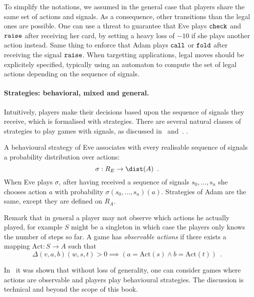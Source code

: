 To simplify the notations,
we assumed in the general case
that players share the same set of actions and signals.
As a consequence, other transitions than the legal ones
are possible. 
One can use a threat to guarantee that Eve plays
${\tt check}$ and ${\tt raise}$ after receiving her card,
by setting a heavy loss of $-10$ if she plays another action instead.
Same thing to enforce that Adam plays ${\tt call}$ or ${\tt fold}$
after receiving the signal ${\tt raise}$.
When targetting applications,
legal moves should be explicitely
specified, typically using an automaton
to compute the set of legal actions
depending on the sequence of signals.



\paragraph{Strategies: behavioral, mixed and general.}

Intuitively, players make their decisions based upon the sequence of
signals they receive, which is formalised with strategies. 
 There are several natural classes of strategies to play  games
 with signals,
as discussed in~\cite{horn_remember} and~\cite[Section 4]{BGGjacm}. 
.

A behavioural strategy of Eve associates
with every realisable sequence of signals a probability distribution
over actions:  
\[
\sigma: R_E \to \dist(A)\enspace.
\]
When Eve plays $\sigma$, after having received a sequence of signals
$s_0,\ldots,s_n$ she chooses action $a$ with probability
$\sigma(s_0,\ldots,s_n)(a)$. 
Strategies of Adam are the same, except they are defined on $R_A$.


Remark that in general a player may not observe which actions he actually played,
for example $S$ might be a singleton 
in which case the players only knows the number of steps so far.
\newcommand{\Act}{\text{Act}}
A game has \emph{observable actions} if there exists a mapping
 $\Act:S \to A$ 
 such that
\[
\Delta(v,a,b)(w,s,t)>0 
\implies
(a=\Act(s) \land b=\Act(t))\enspace. 
\]

In~\cite[Lemma 4.6 and 4.7]{BGGjacm} it was shown that without loss of generality,
one can consider games where actions are observable and players 
play behavioural strategies. The discussion is technical and beyond the scope of this book.


